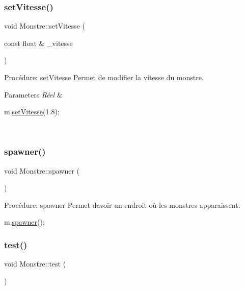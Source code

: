 \subsubsection{\texorpdfstring{set\+Vitesse()}{setVitesse()}}
{\footnotesize\ttfamily void Monstre\+::set\+Vitesse (\begin{DoxyParamCaption}\item[{const float \&}]{\+\_\+vitesse }\end{DoxyParamCaption})}



Procédure\+: set\+Vitesse Permet de modifier la vitesse du monstre. 


\begin{DoxyParams}{Parameters}
{\em Réel} & 
\begin{DoxyCode}
m.\hyperlink{classMonstre_a900cdfe95acf91d17bcf8b33e2b59a97}{setVitesse}(1.8);
\end{DoxyCode}
 \\
\hline
\end{DoxyParams}
\mbox{\label{classMonstre_a26db17b29af1a99278e7d21bc91f1532}} 
\subsubsection{\texorpdfstring{spawner()}{spawner()}}
{\footnotesize\ttfamily void Monstre\+::spawner (\begin{DoxyParamCaption}{ }\end{DoxyParamCaption})}



Procédure\+: spawner Permet d\textquotesingle{}avoir un endroit où les monstres apparaissent. 


\begin{DoxyCode}
m.\hyperlink{classMonstre_a26db17b29af1a99278e7d21bc91f1532}{spawner}();
\end{DoxyCode}
 \mbox{\label{classMonstre_a4f22d17531f5ca164355740d035485ee}} 
\subsubsection{\texorpdfstring{test()}{test()}}
{\footnotesize\ttfamily void Monstre\+::test (\begin{DoxyParamCaption}{ }\end{DoxyParamCaption})}



